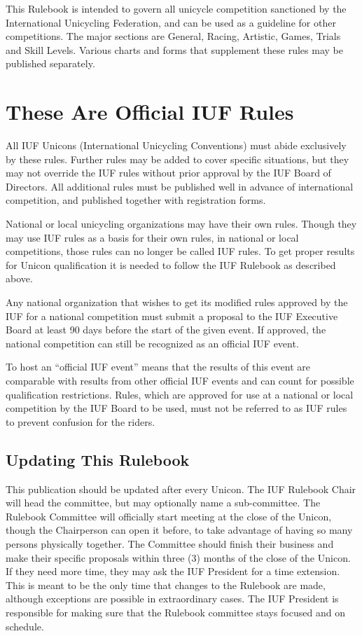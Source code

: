 This Rulebook is intended to govern all unicycle competition sanctioned by the International Unicycling Federation, and can be used as a guideline for other competitions.
The major sections are General, Racing, Artistic, Games, Trials and Skill Levels.
Various charts and forms that supplement these rules may be published separately. 

\section{These Are Official IUF Rules}
All IUF Unicons (International Unicycling Conventions) must abide exclusively by these rules.
Further rules may be added to cover specific situations, but they may not override the IUF rules without prior approval by the IUF Board of Directors.
All additional rules must be published well in advance of international competition, and published together with registration forms.

National or local unicycling organizations may have their own rules.
Though they may use IUF rules as a basis for their own rules, in national or local competitions, those rules can no longer be called IUF rules.
To get proper results for Unicon qualification it is needed to follow the IUF Rulebook as described above.

Any national organization that wishes to get its modified rules approved by the IUF for a national competition must submit a proposal to the IUF Executive Board at least 90 days before the start of the given event.
If approved, the national competition can still be recognized as an official IUF event.

To host an ``official IUF event'' means that the results of this event are comparable with results from other official IUF events and can count for possible qualification restrictions.
Rules, which are approved for use at a national or local competition by the IUF Board to be used, must not be referred to as IUF rules to prevent confusion for the riders.

\subsection{Updating This Rulebook}
This publication should be updated after every Unicon.
The IUF Rulebook Chair will head the committee, but may optionally name a sub-committee.
The Rulebook Committee will officially start meeting at the close of the Unicon, though the Chairperson can open it before, to take advantage of having so many persons physically together.
The Committee should finish their business and make their specific proposals within three (3) months of the close of the Unicon.
If they need more time, they may ask the IUF President for a time extension.
This is meant to be the only time that changes to the Rulebook are made, although exceptions are possible in extraordinary cases.
The IUF President is responsible for making sure that the Rulebook committee stays focused and on schedule.

